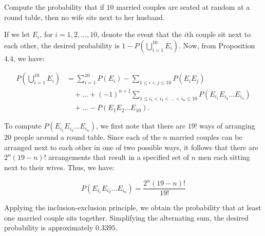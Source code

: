                     \begin{example}
                        Compute the probability that if \(10\) married couples are seated at random at a round table, then no wife sits next to her husband.
                    \end{example}
                        
                        \begin{solution}
                        If we let \(E_i\), for \(i = 1, 2, \ldots, 10\), denote the event that the \(i\)th couple sit next to each other, the desired probability is \(1 - P\left( \bigcup_{i=1}^{10} E_i \right)\). Now, from Proposition 4.4, we have:
                        
                        \begin{align*}
                            P\left( \bigcup_{i=1}^{10} E_i \right) &= \sum_{i=1}^{10} P(E_i) - \sum_{1 \leq i < j \leq 10} P(E_i E_j) \\
                            &\quad + \ldots + (-1)^{n+1} \sum_{1 \leq i_1 < i_2 < \ldots < i_n \leq 10} P(E_{i_1} E_{i_2} \ldots E_{i_n}) \\
                            &\quad + \ldots - P(E_1 E_2 \ldots E_{10}).
                        \end{align*}
                          
                        
                        To compute \(P(E_{i_1} E_{i_2} \ldots E_{i_n})\), we first note that there are \(19!\) ways of arranging \(20\) people around a round table. Since each of the \(n\) married couples can be arranged next to each other in one of two possible ways, it follows that there are \(2^n (19 - n)!\) arrangements that result in a specified set of \(n\) men each sitting next to their wives. Thus, we have:
                        
                        \[
                        P(E_{i_1} E_{i_2} \ldots E_{i_n}) = \frac{2^n (19 - n)!}{19!}
                        \]
                        
                        Applying the inclusion-exclusion principle, we obtain the probability that at least one married couple sits together. Simplifying the alternating sum, the desired probability is approximately \(0.3395\).
                    \end{solution}

